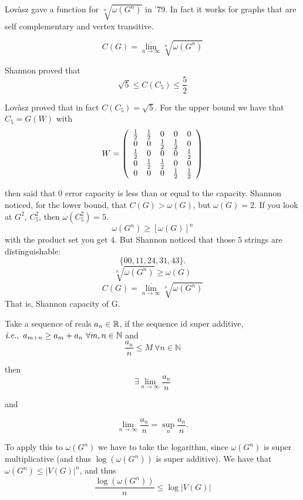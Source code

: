 Lovàsz gave a function for $ \sqrt[n]{\omega(G^n)}$ in '79. In fact it works for graphs that are self complementary and vertex transitive.

\begin{equation}
	C(G) = \overline{\lim_{n\rightarrow \infty}}  \sqrt[n]{\omega(G^n)}
\end{equation}

Shannon proved that
\[
\sqrt{5} \leq C(C_5) \leq \dfrac{5}{2}
\]

Lovàsz proved that in fact $C(C_5) = \sqrt{5}$. For the upper bound we have that $C_5 = G(W)$ with
\[
 W = \left(\begin{array}{c c c c c}
 \frac{1}{2} &\frac{1}{2} & 0&0&0\\
 0&0&\frac{1}{2}&\frac{1}{2}&0\\
 \frac{1}{2}&0&0&0&\frac{1}{2}\\
 0&\frac{1}{2}&\frac{1}{2}&0&0\\
 0&0&0&\frac{1}{2}&\frac{1}{2}\\
 \end{array}\right)
\]

then said that 0 error capacity is less than or equal to the capacity. Shannon noticed, for the lower bound, that $C(G) > \omega(G)$, but $\omega(G) = 2$. If you look at $G^2$, \ie $C_5^2$, then $\omega(C_5^2) = 5$.
\[
\omega(G^n) \geq [\omega(G)]^n
\]
with the product set you get $4$. But Shannon noticed that those $5$ strings are distinguishable:
\[
\{00,11,24,31,43\}.
\]
\[
 \sqrt[n]{\omega(G^n)} \geq \omega(G)
\]
\[
 C(G) = \overline{\lim_{n\rightarrow \infty}}\sqrt[n]{\omega(G^n)}
\]
That is, Shannon capacity of G.

\begin{lem}[Fevete]
Take a sequence of reals $a_n \in \mathbb{R}$, if the sequence id super additive, $\textit{i.e.},\ a_{m+n} \geq a_m + a_n\ \forall m, n \in \mathbb{N}$ and
\[
 \dfrac{a_n}{n} \leq M\ \forall n \in \mathbb{N}
\]

then
\[
 \exists \lim_{n \rightarrow \infty}  \dfrac{a_n}{n} 
\]

and

\[
\lim_{n \rightarrow \infty}  \dfrac{a_n}{n} = \sup_n \dfrac{a_n}{n}. 
\]
 
\end{lem}

To apply this to $\omega(G^n)$ we have to take the logarithm, since $\omega(G^n)$ is super multiplicative (and thus $\log(\omega(G^n))$ is super additive). We have that $\omega(G^n) \leq |V(G)|^n$, and thus
\[
 \dfrac{\log(\omega(G^n))}{n} \leq \log|V(G)|
\]

